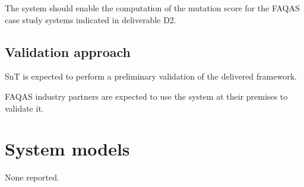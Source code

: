   \RQ{} The system should enable the computation of the mutation score for the FAQAS case study systems indicated in deliverable D2.
 
 \subsection{Validation approach}

\RQ{} SnT is expected to perform a preliminary validation of the delivered framework.

 \RQ{} FAQAS industry partners are expected to use the system at their premises to validate it.
 

%  
% 
%
% 
% 

 \section{System models}
 
 None reported.

